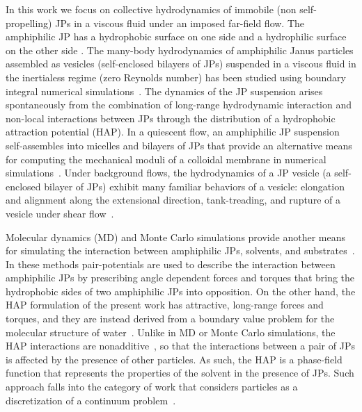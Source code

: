 \documentclass[prb,preprint,showpacs,preprintnumbers,amsmath,amssymb,longbibliography]{revtex4-2}
\begin{document}
In this work we focus on collective hydrodynamics of immobile (non self-propelling)
JPs in a viscous fluid under an imposed far-field flow. The
amphiphilic JP has a hydrophobic surface on one side and a hydrophilic
surface on the other side \cite{doi:10.1021/la503455h}. The many-body
hydrodynamics of amphiphilic Janus particles assembled as vesicles
(self-enclosed bilayers of JPs) suspended in a viscous fluid in the
inertialess regime (zero Reynolds number) has been studied using
boundary integral numerical simulations~\cite{Fu20,Fu2022_JFM}. The
dynamics of the JP suspension arises spontaneously from the combination of long-range
hydrodynamic interaction and non-local interactions between JPs through
the distribution of a hydrophobic attraction potential (HAP).
%
In a quiescent flow, an amphiphilic JP suspension self-assembles into micelles and
bilayers of JPs that provide an alternative means for computing the
mechanical moduli of a colloidal membrane in numerical
simulations~\cite{NaTr00, Fu20, KrFiGuKaHa13}. Under background flows,
the hydrodynamics of a JP vesicle (a self-enclosed bilayer of JPs)
exhibit many familiar behaviors of a vesicle: elongation and alignment
along the extensional direction, tank-treading, and rupture of a vesicle
under shear flow~\cite{Fu2022_JFM, grandmaison_brancherie_salsac_2021,
D2SM00179A,keller_skalak_1982, Finken08, Shaqfeh11}.

Molecular dynamics (MD) and Monte Carlo simulations provide another
means for simulating the interaction between amphiphilic JPs, solvents, and
substrates~\cite{Brandner2019, Baniketal2021,
HongCacciutoLuijtenGranick2008, C9NR05885K}. In these methods
pair-potentials are used to describe the interaction between amphiphilic JPs
by prescribing angle dependent forces and torques that bring the
hydrophobic sides of two amphiphilic JPs into opposition. On the other
hand, the HAP formulation of the present work has attractive, long-range
forces and torques, and they are instead derived from a boundary value
problem for the molecular structure of water~\cite{Ma77, GoHaKo94,
ErLjCl89, Lietal05, Israelachvili80}. Unlike in MD or Monte Carlo
simulations, the HAP interactions are nonadditive~\cite{Fu20}, so that
the interactions between a pair of JPs is affected by the presence of
other particles. As such, the HAP is a phase-field function that
represents the properties of the solvent in the presence of JPs. Such
approach falls into the category of work that considers particles as a
discretization of a continuum problem~\cite{HongWang2021_arXiv}.
\end{document}
